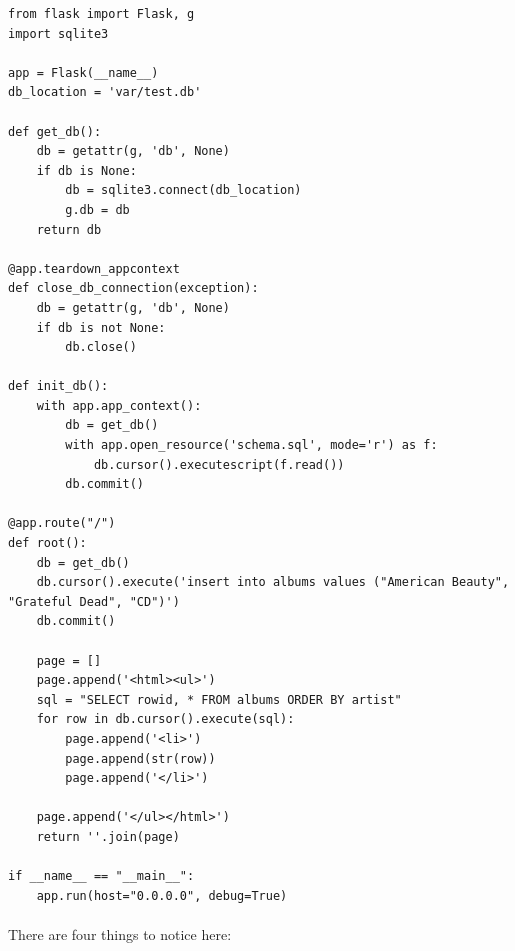 \documentclass[12pt, a4paper, oneside]{book}
\begin{document}
{\begin{lstlisting}
from flask import Flask, g
import sqlite3

app = Flask(__name__)
db_location = 'var/test.db'

def get_db():
    db = getattr(g, 'db', None)
    if db is None:
        db = sqlite3.connect(db_location)
        g.db = db
    return db

@app.teardown_appcontext
def close_db_connection(exception):
    db = getattr(g, 'db', None)
    if db is not None:
        db.close()

def init_db():
    with app.app_context():
        db = get_db() 
        with app.open_resource('schema.sql', mode='r') as f:
            db.cursor().executescript(f.read())
        db.commit()

@app.route("/")
def root():
    db = get_db()
    db.cursor().execute('insert into albums values ("American Beauty", "Grateful Dead", "CD")')
    db.commit()

    page = []
    page.append('<html><ul>')
    sql = "SELECT rowid, * FROM albums ORDER BY artist"
    for row in db.cursor().execute(sql):
        page.append('<li>')
        page.append(str(row))
        page.append('</li>')

    page.append('</ul></html>')
    return ''.join(page)

if __name__ == "__main__":
    app.run(host="0.0.0.0", debug=True)
\end{lstlisting}

\paragraph{} There are four things to notice here:

}
\end{document}
